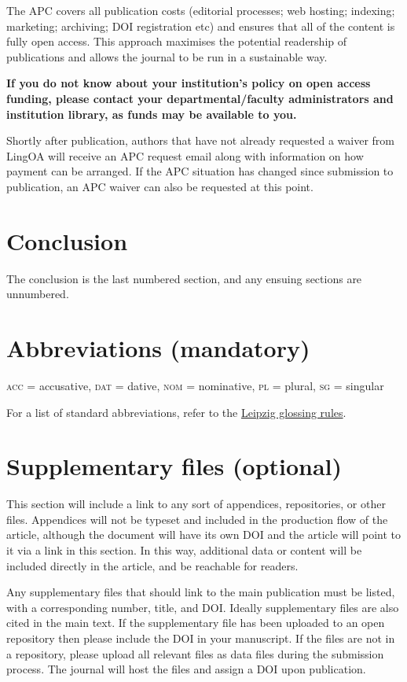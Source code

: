 \documentclass[charis,linguex]{glossa}
\begin{document}
The APC covers all publication costs (editorial processes; web hosting; indexing; marketing; archiving; DOI registration etc) and ensures that all of the content is fully open access. This approach maximises the potential readership of publications and allows the journal to be run in a sustainable way.

\textbf{If you do not know about your institution’s policy on open access funding, please contact your departmental/faculty administrators and institution library, as funds may be available to you.}

Shortly after publication, authors that have not already requested a waiver from LingOA will receive an APC request email along with information on how payment can be arranged. If the APC situation has changed since submission to publication, an APC waiver can also be requested at this point.

\section{Conclusion}

The conclusion is the last numbered section, and any ensuing sections are unnumbered.

\section*{Abbreviations (mandatory)}

\textsc{acc} = accusative, \textsc{dat} = dative, \textsc{nom} = nominative, \textsc{pl} = plural, \textsc{sg} = singular

For a list of standard abbreviations, refer to the \href{https://www.eva.mpg.de/lingua/resources/glossing-rules.php}{Leipzig glossing rules}. 

\section*{Supplementary files (optional)}

This section will include a link to any sort of appendices, repositories, or other files. Appendices will not be typeset and included in the production flow of the article, although the document will have its own DOI and the article will point to it via a link in this section. In this way, additional data or content will be included directly in the article, and  be reachable for readers.

Any supplementary files that should link to the main publication must be listed, with a corresponding number, title, and DOI. Ideally supplementary files are also cited in the main text. If the supplementary file has been uploaded to an open repository then please include the DOI in your manuscript. If the files are not in a repository, please upload all relevant files as data files during the submission process. The journal will host the files and assign a DOI upon publication. 
\end{document}
